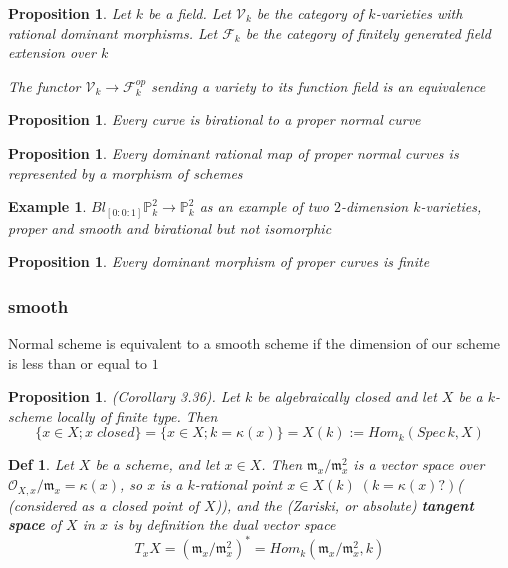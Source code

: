 \documentclass{article}
\newtheorem{definition}[theorem]{Def}
\newtheorem{example}[theorem]{Example}
\newtheorem{proposition}[theorem]{Proposition}
\begin{document}
\begin{proposition}
    Let $k$ be a field. Let $\mathcal V_k$ be the category of $k$-varieties with rational dominant morphisms. Let $\mathcal F_k$ be the category of finitely generated field extension over $k$

    The functor $\mathcal V_k \to \mathcal F_k^{op}$ sending a variety to its function field is an equivalence
\end{proposition}

\begin{proposition}
    Every curve is birational to a proper normal curve
\end{proposition}

\begin{proposition}
    Every dominant rational map of proper normal curves is represented by a morphism of schemes
\end{proposition}

\begin{example}
$Bl_{[0:0:1]}\mathbb P_k^2 \to \mathbb P_k^2$ as an example of two $2$-dimension $k$-varieties, proper and smooth and birational but not isomorphic
\end{example}

\begin{proposition}
    Every dominant morphism of proper curves is finite
\end{proposition}


\subsubsection{smooth}

Normal scheme is equivalent to a smooth scheme if the dimension
of our scheme is less than or equal to $1$

\begin{proposition}
(Corollary 3.36). Let $k$ be algebraically closed and let $X$ be a $k$-scheme locally of finite
type. Then
$$
\{ x \in X ; x \; closed \} = \{ x \in X ; k = \kappa(x) \} = X(k) := Hom_k(Spec\, k,X)
$$
\end{proposition}


\begin{definition}
Let $X$ be a scheme, and let $x \in X$. Then $\mathfrak m_x/\mathfrak m_x^2$ is a vector space over
$\mathcal O_{X,x}/\mathfrak m_x = \kappa(x)$, so $x$ is a $k$-rational point $x \in X(k)\;(k=\kappa(x)?)$( (considered as a closed point of $X$)), and the (Zariski, or absolute) \textbf{tangent space} of $X$ in $x$ is by definition
the dual vector space
$$
T_xX 
= (\mathfrak m_x/\mathfrak m_x^2)
^\ast
= Hom_k(\mathfrak m_x/\mathfrak m_x^2, k)
$$
\end{definition}
\end{document}
